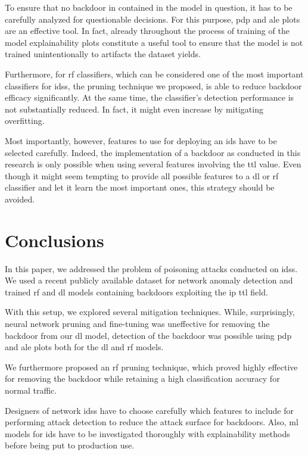 \documentclass[10pt,sigconf,letterpaper,dvipsnames]{acmart}
\begin{document}
To ensure that no backdoor in contained in the model in question, it has to be carefully analyzed for questionable decisions. For this purpose, \gls{pdp} and \gls{ale} plots are an effective tool. In fact, already throughout the process of training of the model explainability plots constitute a useful tool to ensure that the model is not trained unintentionally to artifacts the dataset yields.

Furthermore, for \gls{rf} classifiers, which can be considered one of the most important classifiers for \glspl{ids}, the pruning technique we proposed, is able to reduce backdoor efficacy significantly. At the same time, the classifier's detection performance is not substantially reduced. In fact, it might even increase by mitigating overfitting.

Most importantly, however, features to use for deploying an \gls{ids} have to be selected carefully. Indeed, the implementation of a backdoor as conducted in this research is only possible when using several features involving the \gls{ttl} value. Even though it might seem tempting to provide all possible features to a \gls{dl} or \gls{rf} classifier and let it learn the most important ones, this strategy should be avoided.

\section{Conclusions}
In this paper, we addressed the problem of poisoning attacks conducted on \glspl{ids}. We used a recent publicly available dataset for network anomaly detection and trained \gls{rf} and \gls{dl} models containing backdoors exploiting the \gls{ip} \gls{ttl} field.

With this setup, we explored several mitigation techniques. While, surprisingly, neural network pruning and fine-tuning was uneffective for removing the backdoor from our \gls{dl} model, detection of the backdoor was possible using \gls{pdp} and \gls{ale} plots both for the \gls{dl} and \gls{rf} models.

We furthermore proposed an \gls{rf} pruning technique, which proved highly effective for removing the backdoor while retaining a high classification accuracy for normal traffic.

Designers of network \glspl{ids} have to choose carefully which features to include for performing attack detection to reduce the attack surface for backdoors. Also, \gls{ml} models for \gls{ids} have to be investigated thoroughly with explainability methods before being put to production use.
\end{document}

